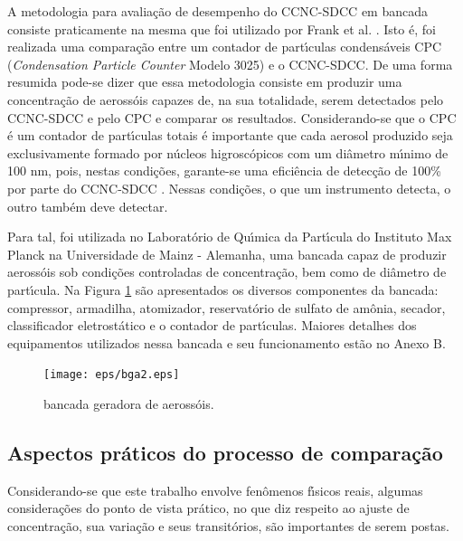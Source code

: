 A metodologia para avalia\c{c}\~{a}o de desempenho do CCNC-SDCC em bancada consiste praticamente na mesma que foi utilizado por Frank et al. \cite{Frank}.  Isto \'{e}, foi realizada uma compara\c{c}\~{a}o entre um contador de part\'{\i}culas condens\'{a}veis CPC (\emph{Condensation Particle Counter} Modelo 3025) e o CCNC-SDCC. De uma forma resumida pode-se dizer que essa metodologia consiste em produzir uma concentra\c{c}\~{a}o de aeross\'{o}is capazes de, na sua totalidade, serem detectados pelo CCNC-SDCC e pelo CPC e comparar os resultados. Considerando-se que o CPC \'{e} um contador de part\'{\i}culas totais \'{e} importante que cada aerosol produzido seja exclusivamente formado por n\'{u}cleos higrosc\'{o}picos com um  di\^{a}metro m\'{\i}nimo de 100 nm, pois, nestas condi\c{c}\~{o}es, garante-se uma efici\^{e}ncia de detec\c{c}\~{a}o de 100\% por parte do CCNC-SDCC  \cite{HSU}. Nessas condi\c{c}\~{o}es, o que um instrumento detecta, o outro tamb\'{e}m deve detectar.

Para tal, foi utilizada no Laborat\'{o}rio de Qu\'{\i}mica da Part\'{\i}cula do Instituto Max Planck na Universidade de Mainz - Alemanha, uma bancada capaz de produzir aeross\'{o}is sob condi\c{c}\~{o}es controladas de concentra\c{c}\~{a}o, bem como de di\^{a}metro de part\'{\i}cula. Na Figura \ref{bga} s\~{a}o apresentados os diversos componentes da bancada: compressor, armadilha, atomizador, reservat\'{o}rio de sulfato de am\^{o}nia, secador, classificador eletrost\'{a}tico e o contador de part\'{\i}culas. Maiores detalhes dos equipamentos utilizados nessa bancada e seu funcionamento est\~{a}o no Anexo B.




\begin{figure}[htb]
\begin{center}
\texttt{[image: eps/bga2.eps]}\\
\end{center}
\caption{\label{bga}\hspace{-0.1em} bancada geradora de aeross\'{o}is.}
\end{figure}

\subsection{Aspectos pr\'{a}ticos do processo de compara\c{c}\~{a}o}
Considerando-se que este trabalho envolve fen\^{o}menos f\'{\i}sicos reais, algumas considera\c{c}\~{o}es do ponto de vista pr\'{a}tico, no que diz respeito ao ajuste de concentra\c{c}\~{a}o, sua varia\c{c}\~{a}o e seus transit\'{o}rios, s\~{a}o importantes de serem postas.


